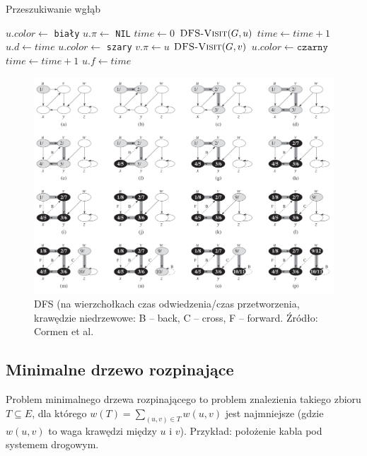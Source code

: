 \documentclass[10pt, oneside]{article}
\theoremstyle{remark}
\newcommand{\algcost}[2]{\strut\hfill\makebox[1.5cm][l]{#1}\makebox[4cm][l]{#2}}
\begin{document}
\begin{algorithm}
    \caption{Przeszukiwanie wgłąb}
    \label{alg:dfs}
    \begin{algorithmic}[1] %
         \algcost{}{//$O(|V|+|E|)$}
            		\State $u.color \gets$ \texttt{biały}
            		\State $u.\pi \gets$ \texttt{NIL} 
            	\EndFor
            	\State $time \gets 0$
            			\State $\Call{DFS-Visit}{G, u}$
            		\EndIf
            	\EndFor
        \EndFunction
        		\State $time \gets time + 1$
        		\State $u.d \gets time$
            	\State $u.color \gets$ \texttt{szary}
        				\State $v.\pi \gets u$
        				\State $\Call{DFS-Visit}{G, v}$
        			\EndIf         
            	\EndFor
            	\State $u.color \gets \texttt{czarny}$
            	\State $time \gets time + 1$
            	\State $u.f \gets time$
        \EndFunction
    \end{algorithmic}
\end{algorithm}

\begin{figure}[htpb]
	\centering
	\includegraphics[width=.9\textwidth]{figures/dfs}
	\caption{DFS (na wierzchołkach czas odwiedzenia/czas przetworzenia, krawędzie niedrzewowe: B -- back, C -- cross, F -- forward. Źródło: Cormen et al.}
\end{figure}


\subsection{Minimalne drzewo rozpinające}
Problem minimalnego drzewa rozpinającego to problem znalezienia takiego zbioru $T \subseteq E$, dla którego $w(T) = \sum_{(u,v) \in T} w(u,v)$ jest najmniejsze (gdzie $w(u,v)$ to waga krawędzi między $u$ i $v$).
Przykład: położenie kabla pod systemem drogowym.
\end{document}
